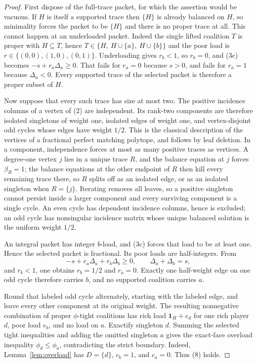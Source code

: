 \documentclass[11pt]{article}
\newcommand{\one}{\mathbf 1}
\begin{document}
\begin{proof}
First dispose of the full-trace packet, for which the assertion would be
vacuous.  If $H$ is itself a supported trace then $\{H\}$ is already balanced
on $H$, so minimality forces the packet to be $\{H\}$ and there is no proper
trace at all.  This cannot happen at an underloaded packet.  Indeed the
single lifted coalition $T$ is proper with $H\subseteq T$, hence
$T\in\{H,\ H\cup\{a\},\ H\cup\{b\}\}$ and the poor load is
$r\in\{(0,0),(1,0),(0,1)\}$.  Underloading gives $r_b<1$, so $r_b=0$, and
(3c) becomes $-s+r_a\Delta_a\ge0$.  That fails for $r_a=0$ because $s>0$,
and fails for $r_a=1$ because $\Delta_a<0$.  Every supported trace of the
selected packet is therefore a proper subset of $H$.

Now suppose that every such trace has size at most two.
The positive incidence columns of a vertex of (2) are independent.  Its
rank-two components are therefore isolated singletons of weight one,
isolated edges of weight one, and vertex-disjoint odd cycles whose edges
have weight $1/2$.  This is the classical description of the vertices of a
fractional perfect matching polytope, and follows by leaf deletion.  In a
component, independence forces at most as many positive traces as vertices.
A degree-one vertex $j$ lies in a unique trace $R$, and the balance equation
at $j$ forces $\beta_R=1$; the balance equations at the other endpoint of
$R$ then kill every remaining trace there, so $R$ splits off as an isolated
edge, or as an isolated singleton when $R=\{j\}$.  Iterating removes all
leaves, so a positive singleton cannot persist inside a larger component and
every surviving component is a single cycle.  An even cycle has dependent
incidence columns, hence is excluded; an odd cycle has nonsingular incidence
matrix whose unique balanced solution is the uniform weight $1/2$.

An integral packet has integer $b$-load, and (3c) forces that load to be at
least one.  Hence the selected packet is fractional.  Its poor loads are
half-integers.  From
\[
 -s+r_a\Delta_a+r_b\Delta_b\ge0,\qquad
 \Delta_a+\Delta_b=s,
\]
and $r_b<1$, one obtains $r_b=1/2$ and $r_a=0$.  Exactly one half-weight
edge on one odd cycle therefore carries $b$, and no supported coalition
carries $a$.

Round that labeled odd cycle alternately, starting with the labeled edge,
and leave every other component at its original weight.  The resulting
nonnegative combination of proper $\phi$-tight coalitions has rich load
$\one_H+e_d$ for one rich player $d$, poor load $e_b$, and no load on $a$.
Exactify singleton $d$.  Summing the selected tight inequalities and adding
the omitted singleton $a$ gives the exact-face overload inequality
$\phi_d\le\phi_a$, contradicting the strict boundary. Indeed,
Lemma~\ref{lem:overload} has $D=\{d\}$, $c_b=1$, and $c_a=0$.
Thus (8) holds.
\end{proof}
\end{document}
